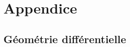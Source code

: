 \documentclass{article}
\theoremstyle{definition}
\begin{document}

\section{Appendice}

\subsection{Géométrie différentielle}



 
\nocite{*}
\end{document}
